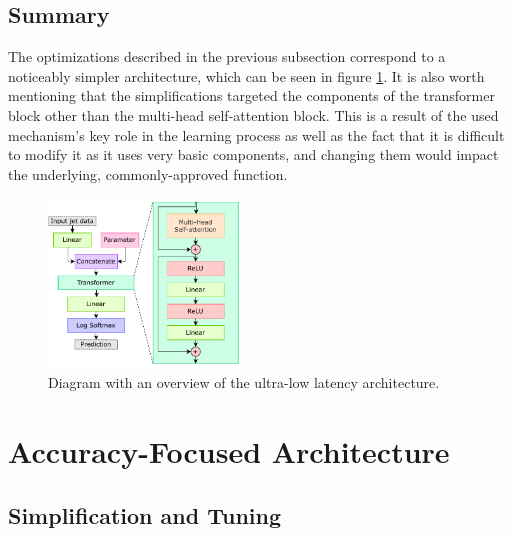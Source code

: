 \todofig{|}
\todofig{|}
\todofig{|}
\todofig{|}

\subsection{Summary}
The optimizations described in the previous subsection correspond to a noticeably simpler architecture, which can be seen in figure \ref{fig:constituent-net-simplified}. It is also worth mentioning that the simplifications targeted the components of the transformer block other than the multi-head self-attention block. This is a result of the used mechanism's key role in the learning process as well as the fact that it is difficult to modify it as it uses very basic components, and changing them would impact the underlying, commonly-approved function.

\begin{figure}[hpt!]
  \centering
  \includegraphics[trim={0cm 0cm 0cm 0cm}, width=0.45\textwidth, center]{models/constituent_net_simplified.pdf}
  \caption{Diagram with an overview of the ultra-low latency architecture.}
  \label{fig:constituent-net-simplified}
\end{figure}


\section{Accuracy-Focused Architecture}
\indo{|}
\indo{|}

\subsection{Simplification and Tuning}
\indo{|}
\indo{|}
\indo{|}
\indo{|}
\indo{|}


